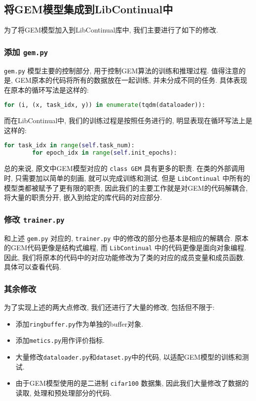 \subsection{将GEM模型集成到LibContinual中}
为了将GEM模型加入到LibContinual库中, 我们主要进行了如下的修改. 
\subsubsection{\texorpdfstring{添加 \lstinline{gem.py}}{添加 gem.py}}

\lstinline{gem.py} 模型主要的控制部分, 用于控制GEM算法的训练和推理过程. 值得注意的是, GEM原本的代码将所有的数据放在一起训练, 并未分成不同的任务. 具体表现在原本的循环写法是这样的:
\begin{lstlisting}[language=python]
    for (i, (x, task_idx, y)) in enumerate(tqdm(dataloader)):
\end{lstlisting}
而在LibContinual中, 我们的训练过程是按照任务进行的, 明显表现在循环写法上是这样的:
\begin{lstlisting}[language=python]
    for task_idx in range(self.task_num):
        for epoch_idx in range(self.init_epochs):
\end{lstlisting}

总的来说, 原文中GEM模型对应的 \lstinline{class GEM} 具有更多的职责. 在类的外部调用时, 只需要加以简单的刻画, 就可以完成训练和测试. 但是 \lstinline{LibContinual} 中所有的模型类都被赋予了更有限的职责, 因此我们的主要工作就是对GEM的代码解耦合, 将大量的职责分开, 嵌入到给定的库代码的对应部分.


\subsubsection{\texorpdfstring{修改 \lstinline{trainer.py}}{修改 trainer.py}}
和上述 \lstinline{gem.py} 对应的, \lstinline{trainer.py} 中的修改的部分也基本是相应的解耦合. 原本的GEM代码更像是结构式编程, 而 \lstinline{LibContinual} 中的代码更像是面向对象编程. 因此, 我们将原本的代码中的对应功能修改为了类的对应的成员变量和成员函数. 具体可以查看代码.

\subsubsection{其余修改}
为了实现上述的两大点修改, 我们还进行了大量的修改, 包括但不限于:
\begin{itemize}
    \item 添加\lstinline{ringbuffer.py}作为单独的buffer对象.
    \item 添加\lstinline{metics.py}用作评价指标.
    \item 大量修改\lstinline{dataloader.py}和\lstinline{dataset.py}中的代码, 以适配GEM模型的训练和测试. 
    \item 由于GEM模型使用的是二进制 \lstinline{cifar100} 数据集, 因此我们大量修改了数据的读取, 处理和预处理部分的代码.
\end{itemize}

